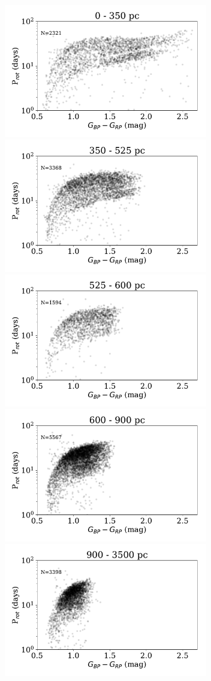 \documentclass[preprint2]{aastex62}
\begin{document}
\begin{figure}[]
\centering
\includegraphics[width=3.5in]{../figures/rot_dist_0}
\includegraphics[width=3.5in]{../figures/rot_dist_350}
\includegraphics[width=3.5in]{../figures/rot_dist_525}
\includegraphics[width=3.5in]{../figures/rot_dist_600}
\includegraphics[width=3.5in]{../figures/rot_dist_900}

\end{figure}
\end{document}
